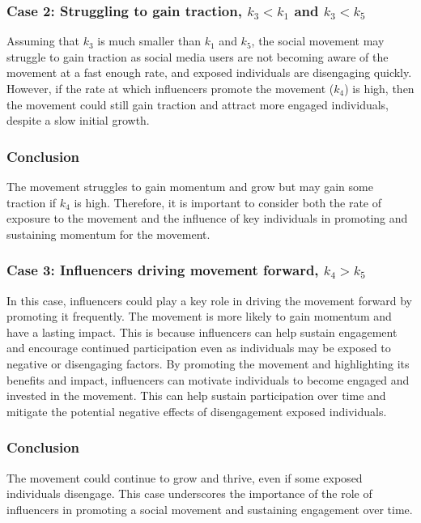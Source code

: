 \documentclass{article}
\begin{document}
    \subsubsection*{Case 2: Struggling to gain traction, $k_3 < k_1$ and $k_3 < k_5$}
    \begin{tcolorbox}
    Assuming that $k_3$ is much smaller than $k_1$ and $k_5$, the social movement may struggle to gain traction as social media users are not becoming aware of the movement at a fast enough rate, and exposed individuals are disengaging quickly. However, if the rate at which influencers promote the movement ($k_4$) is high, then the movement could still gain traction and attract more engaged individuals, despite a slow initial growth.
    \subsubsection*{Conclusion} The movement  struggles to gain momentum and grow but may gain some traction if $k_4$ is high. Therefore, it is important to consider both the rate of exposure to the movement and the influence of key individuals in promoting and sustaining momentum for the movement.
    \end{tcolorbox}
    
    \subsubsection*{Case 3: Influencers driving movement forward, $k_4 > k_5$} \normalfont
    \begin{tcolorbox}
     In this case, influencers could play a key role in driving the movement forward by promoting it frequently. The movement is more likely to gain momentum and have a lasting impact. This is because influencers can help sustain engagement and encourage continued participation even as individuals may be exposed to negative or disengaging factors. By promoting the movement and highlighting its benefits and impact, influencers can motivate individuals to become engaged and invested in the movement. This can help sustain participation over time and mitigate the potential negative effects of disengagement  exposed individuals.
    \subsubsection*{Conclusion}The movement could continue to grow and thrive, even if some exposed individuals disengage. This case underscores the importance of the role of influencers in promoting a social movement and sustaining engagement over time. 
    \end{tcolorbox}
\end{document}
